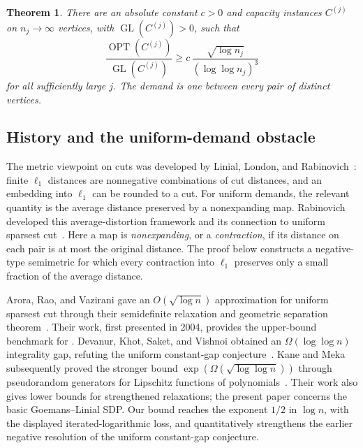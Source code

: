 \documentclass[11pt]{article}
\numberwithin{equation}{section}
\newtheorem{theorem}{Theorem}[section]
\theoremstyle{definition}
\theoremstyle{remark}
\DeclareMathOperator{\GL}{GL}
\DeclareMathOperator{\OPT}{OPT}
\begin{document}
\begin{theorem}\label{thm:main}
There are an absolute constant $c>0$ and capacity instances $C^{(j)}$
on $n_j\to\infty$ vertices, with $\GL(C^{(j)})>0$, such that
\[
\frac{\OPT(C^{(j)})}{\GL(C^{(j)})}
\ge c\,\frac{\sqrt{\log n_j}}{(\log\log n_j)^3}
\]
for all sufficiently large $j$. The demand is one between every pair
of distinct vertices.
\end{theorem}

\subsection{History and the uniform-demand obstacle}

The metric viewpoint on cuts was developed by Linial, London, and
Rabinovich~\cite{LLR95}: finite $\ell_1$ distances are nonnegative
combinations of cut distances, and an embedding into $\ell_1$ can be
rounded to a cut. For uniform demands, the relevant quantity is the
average distance preserved by a nonexpanding map. Rabinovich developed
this average-distortion framework and its connection to uniform
sparsest cut~\cite{Rab03,Rab08}. Here a map is \emph{nonexpanding}, or a
\emph{contraction}, if its distance on each pair is at most the original
distance. The proof below constructs a negative-type semimetric for
which every contraction into $\ell_1$ preserves only a small fraction
of the average distance.

Arora, Rao, and Vazirani gave an $O(\sqrt{\log n})$ approximation for
uniform sparsest cut through their semidefinite relaxation and geometric
separation theorem~\cite{ARV09}. Their work, first presented in 2004,
provides the upper-bound benchmark for . Devanur, Khot,
Saket, and Vishnoi obtained an $\Omega(\log\log n)$ integrality gap,
refuting the uniform constant-gap conjecture~\cite{DKSV06}.
Kane and Meka subsequently proved the stronger bound
$\exp(\Omega(\sqrt{\log\log n}))$ through pseudorandom generators for
Lipschitz functions of polynomials~\cite{KM13}. Their work also gives
lower bounds for strengthened relaxations; the present paper concerns
the basic Goemans--Linial SDP. Our bound reaches the exponent $1/2$ in
$\log n$, with the displayed iterated-logarithmic loss, and quantitatively
strengthens the earlier negative resolution of the uniform constant-gap
conjecture.
\end{document}
